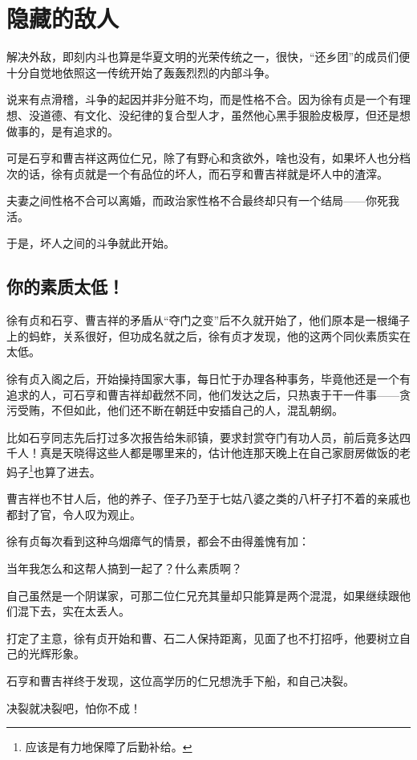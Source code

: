\section{隐藏的敌人}
\ifnum{}
	\begin{multicols}{\theparacolNo}
\fi
解决外敌，即刻内斗也算是华夏文明的光荣传统之一，很快，“还乡团”的成员们便十分自觉地依照这一传统开始了轰轰烈烈的内部斗争。

说来有点滑稽，斗争的起因并非分赃不均，而是性格不合。因为徐有贞是一个有理想、没道德、有文化、没纪律的复合型人才，虽然他心黑手狠脸皮极厚，但还是想做事的，是有追求的。

可是石亨和曹吉祥这两位仁兄，除了有野心和贪欲外，啥也没有，如果坏人也分档次的话，徐有贞就是一个有品位的坏人，而石亨和曹吉祥就是坏人中的渣滓。

夫妻之间性格不合可以离婚，而政治家性格不合最终却只有一个结局——你死我活。

于是，坏人之间的斗争就此开始。

\subsection{你的素质太低！}
徐有贞和石亨、曹吉祥的矛盾从“夺门之变”后不久就开始了，他们原本是一根绳子上的蚂蚱，关系很好，但功成名就之后，徐有贞才发现，他的这两个同伙素质实在太低。

徐有贞入阁之后，开始操持国家大事，每日忙于办理各种事务，毕竟他还是一个有追求的人，可石亨和曹吉祥却截然不同，他们发达之后，只热衷于干一件事——贪污受贿，不但如此，他们还不断在朝廷中安插自己的人，混乱朝纲。

比如石亨同志先后打过多次报告给朱祁镇，要求封赏夺门有功人员，前后竟多达四千人！真是天晓得这些人都是哪里来的，估计他连那天晚上在自己家厨房做饭的老妈子\footnote{应该是有力地保障了后勤补给。}也算了进去。

曹吉祥也不甘人后，他的养子、侄子乃至于七姑八婆之类的八杆子打不着的亲戚也都封了官，令人叹为观止。

徐有贞每次看到这种乌烟瘴气的情景，都会不由得羞愧有加：

当年我怎么和这帮人搞到一起了？什么素质啊？

自己虽然是一个阴谋家，可那二位仁兄充其量却只能算是两个混混，如果继续跟他们混下去，实在太丢人。

打定了主意，徐有贞开始和曹、石二人保持距离，见面了也不打招呼，他要树立自己的光辉形象。

石亨和曹吉祥终于发现，这位高学历的仁兄想洗手下船，和自己决裂。

决裂就决裂吧，怕你不成！


\end{multicols}
